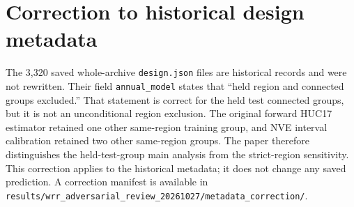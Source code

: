 \section*{Correction to historical design metadata}
The 3,320 saved whole-archive \texttt{design.json} files are historical records and were not rewritten. Their field \texttt{annual\_model} states that ``held region and connected groups excluded.'' That statement is correct for the held test connected groups, but it is not an unconditional region exclusion. The original forward HUC17 estimator retained one other same-region training group, and NVE interval calibration retained two other same-region groups. The paper therefore distinguishes the held-test-group main analysis from the strict-region sensitivity. This correction applies to the historical metadata; it does not change any saved prediction. A correction manifest is available in \texttt{results/wrr\_adversarial\_review\_20261027/metadata\_correction/}.

